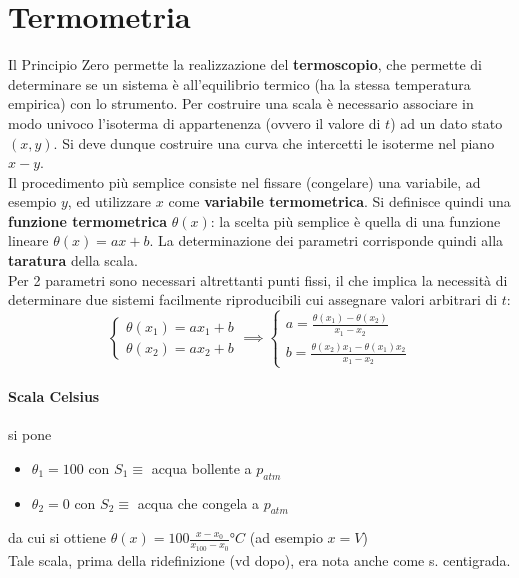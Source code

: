 \documentclass[10pt, oneside]{book}
\begin{document}
\section{Termometria}
Il Principio Zero permette la realizzazione del \textbf{termoscopio}, che permette di determinare se un sistema è all'equilibrio termico (ha la stessa temperatura empirica) con lo strumento. Per costruire una scala è necessario associare in modo univoco l'isoterma di appartenenza (ovvero il valore di $t$) ad un dato stato $(x,y)$. Si deve dunque costruire una curva che intercetti le isoterme nel piano $x-y$. 
\\Il procedimento più semplice consiste nel fissare (congelare) una variabile, ad esempio $y$, ed utilizzare $x$ come \textbf{variabile termometrica}. Si definisce quindi una \textbf{funzione termometrica} $\theta(x)$: la scelta più semplice è quella di una funzione lineare $\theta(x) = ax + b$. La determinazione dei parametri corrisponde quindi alla \textbf{taratura} della scala.
\\Per 2 parametri sono necessari altrettanti punti fissi, il che implica la necessità di determinare due sistemi facilmente riproducibili cui assegnare valori arbitrari di $t$:
\[\begin{cases} \theta (x_1) = a x_1 + b \\ \theta (x_2) = a x_2 + b

\end{cases} \implies \begin{cases} a = \frac{\theta (x_1) - \theta (x_2)}{x_1 - x_2} \\ b = \frac{\theta (x_2) x_1 - \theta (x_1) x_2}{x_1 - x_2}

\end{cases}\]

\paragraph{Scala Celsius} si pone
\begin{itemize}
\item $\theta_1 = 100$ con $S_1 \equiv$ acqua bollente a $p_{atm}$
\item $\theta_2 = 0$ con $S_2 \equiv$ acqua che congela a $p_{atm}$
\end{itemize}
da cui si ottiene $\displaystyle \theta(x) = 100 \frac{x - x_0}{x_100 - x_0} °C$ (ad esempio $x = V$)
\\Tale scala, prima della ridefinizione (vd dopo), era nota anche come s. centigrada.
\end{document}
